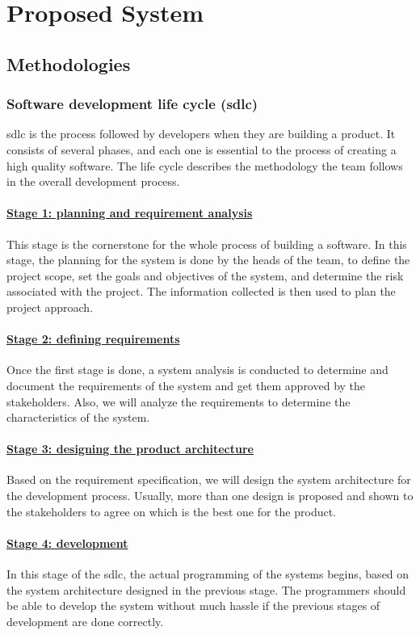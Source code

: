 \documentclass[../main.tex]{subfiles}
\begin{document}
\chapter{Proposed System}
\section{Methodologies}
\subsection{Software development life cycle (\acrshort{sdlc})}
\acrfull{sdlc} is the process followed by developers when they are building a product. It consists of several phases, and each one is essential to the process of creating a high quality software. The life cycle describes the methodology the team follows in the overall development process. 
\subsubsection*{\underline{Stage 1: planning and requirement analysis
}}
This stage is the cornerstone for the whole process of building a software. In this stage, the planning for the system is done by the heads of the team, to define the project scope, set the goals and objectives of the system, and determine the risk associated with the project. The information collected is then used to plan the project approach. 
\subsubsection*{\underline{Stage 2: defining requirements
}} 
Once the first stage is done, a system analysis is conducted to determine and document the requirements of the system and get them approved by the stakeholders. Also, we will analyze the requirements to determine the characteristics of the system. 
\subsubsection*{\underline{Stage 3: designing the product architecture 
}} 
Based on the requirement specification, we will design the system architecture for the development process. Usually, more than one design is proposed and shown to the stakeholders to agree on which is the best one for the product. 
\subsubsection*{\underline{Stage 4: development
}}  
In this stage of the \acrshort{sdlc}, the actual programming of the systems begins, based on the system architecture designed in the previous stage. The programmers should be able to develop the system without much hassle if the previous stages of development are done correctly. 
\end{document}
